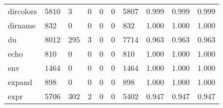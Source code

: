 \begin{longtable}{lp{1.3cm}p{1.3cm}p{1.3cm}p{1.3cm}p{1.3cm}p{1.3cm}p{1.3cm}p{1.3cm}p{1.3cm}}
dircolors &                   5810 &                                  3 &                                 0 &                                0 &                                 0 &                            5807 &                                   0.999 &                                  0.999 &                                0.999 \\
dirname   &                    832 &                                  0 &                                 0 &                                0 &                                 0 &                             832 &                                   1.000 &                                  1.000 &                                1.000 \\
du        &                   8012 &                                295 &                                 3 &                                0 &                                 0 &                            7714 &                                   0.963 &                                  0.963 &                                0.963 \\
echo      &                    810 &                                  0 &                                 0 &                                0 &                                 0 &                             810 &                                   1.000 &                                  1.000 &                                1.000 \\
env       &                   1464 &                                  0 &                                 0 &                                0 &                                 0 &                            1464 &                                   1.000 &                                  1.000 &                                1.000 \\
expand    &                    898 &                                  0 &                                 0 &                                0 &                                 0 &                             898 &                                   1.000 &                                  1.000 &                                1.000 \\
expr      &                   5706 &                                302 &                                 2 &                                0 &                                 0 &                            5402 &                                   0.947 &                                  0.947 &                                0.947 \\

\end{longtable}
